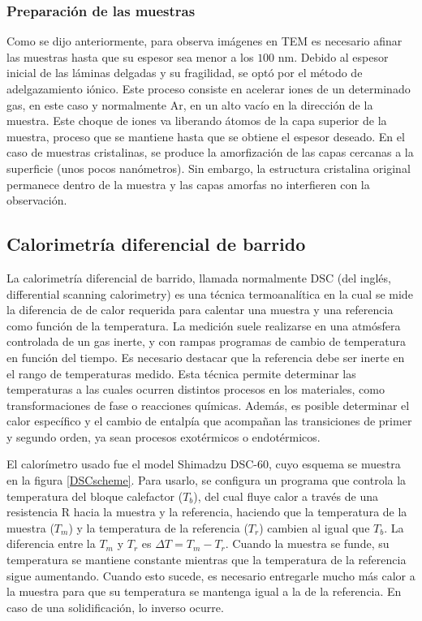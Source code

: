 \documentclass[12pt]{article}
\theoremstyle{definition}
\theoremstyle{remark}
\begin{document}
{\subsubsection{Preparación de las muestras}

Como se dijo anteriormente, para observa imágenes en TEM es necesario afinar las muestras hasta que su espesor sea menor a los $100$ nm. Debido al espesor inicial de las láminas delgadas y su fragilidad, se optó por el método de adelgazamiento iónico. Este proceso consiste en acelerar iones de un determinado gas, en este caso y normalmente Ar, en un alto vacío en la dirección de la muestra. Este choque de iones va liberando átomos de la capa superior de la muestra, proceso que se mantiene hasta que se obtiene el espesor deseado. En el caso de muestras cristalinas, se produce la amorfización de las capas cercanas a la superficie (unos pocos nanómetros). Sin embargo, la estructura cristalina original permanece dentro de la muestra y las capas amorfas no interfieren con la observación. 
 
\subsection{Calorimetría diferencial de barrido}

La calorimetría diferencial de barrido, llamada normalmente DSC (del inglés, differential scanning calorimetry) es una técnica termoanalítica en la cual se mide la diferencia de de calor requerida para calentar una muestra y una referencia como función de la temperatura. La medición suele realizarse en una atmósfera controlada de un gas inerte, y con rampas programas de cambio de temperatura en función del tiempo.  Es necesario destacar que la referencia debe ser inerte en el rango de temperaturas medido.
Esta técnica permite determinar las temperaturas a las cuales ocurren distintos procesos en los materiales, como transformaciones de fase o reacciones químicas. Además, es posible determinar el calor específico y el cambio de entalpía que acompañan las transiciones de primer y segundo orden, ya sean procesos exotérmicos o endotérmicos.

El calorímetro usado fue el model Shimadzu DSC-60, cuyo esquema se muestra en la figura \ref{DSCscheme}. Para usarlo, se configura un programa que controla la temperatura del bloque calefactor ($T_b$), del cual fluye calor a través de una resistencia R hacia la muestra y la referencia, haciendo que la temperatura de la muestra ($T_m$) y la temperatura de la referencia ($T_r$) cambien al igual que $T_b$. La diferencia entre la $T_m$ y $T_r$ es $\Delta T = T_m - T_r$. Cuando la muestra se funde, su temperatura se mantiene constante mientras que la temperatura de la referencia sigue aumentando. Cuando esto sucede, es necesario entregarle mucho más calor a la muestra para que su temperatura se mantenga igual a la de la referencia. En caso de una solidificación, lo inverso ocurre.

}
\end{document}
